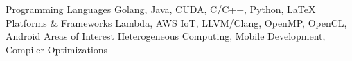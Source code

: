 \begin{cventries}
\vspace{-10mm}
    \cvskill
    {Programming Languages}
    {Golang, Java, CUDA, C/C++, Python, LaTeX}
    \cvskill
    {Platforms \& Frameworks}
    {Lambda, AWS IoT, LLVM/Clang, OpenMP, OpenCL, Android}
    \cvskill
    {Areas of Interest}
    {Heterogeneous Computing, Mobile Development, Compiler Optimizations}
\end{cventries}
